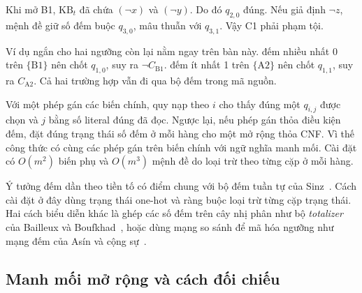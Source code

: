 \documentclass[11pt,a4paper]{article}
\newcommand{\code}[1]{\texttt{\detokenize{#1}}}
\newcommand{\KB}{\mathrm{KB}}
\begin{document}
Khi mở B1, $\KB_t$ đã chứa $(\neg x)$ và $(\neg y)$.
Do đó $q_{2,0}$ đúng. Nếu giả định $\neg z$, mệnh đề giữ số đếm
buộc $q_{3,0}$, mâu thuẫn với $q_{3,1}$.
Vậy C1 phải phạm tội.

Ví dụ ngắn cho hai ngưỡng còn lại nằm ngay trên bàn này.
\code{clue_A1} đếm nhiều nhất 0 trên $\{\mathrm{B1}\}$ nên
chốt $q_{1,0}$, suy ra $\neg C_{\mathrm{B1}}$.
\code{clue_C1} đếm ít nhất 1 trên $\{\mathrm{A2}\}$ nên chốt
$q_{1,1}$, suy ra $C_{\mathrm{A2}}$.
Cả hai trường hợp vẫn đi qua bộ đếm trong mã nguồn.

Với một phép gán các biến chính, quy nạp theo $i$ cho thấy đúng
một $q_{i,j}$ được chọn và $j$ bằng số literal đúng đã đọc.
Ngược lại, nếu phép gán thỏa điều kiện đếm, đặt đúng trạng thái
số đếm ở mỗi hàng cho một mở rộng thỏa CNF.
Vì thế công thức có cùng các phép gán trên biến chính với ngữ
nghĩa manh mối. Cài đặt có $O(m^2)$ biến phụ và $O(m^3)$
mệnh đề do loại trừ theo từng cặp ở mỗi hàng.

Ý tưởng đếm dần theo tiền tố có điểm chung với bộ đếm tuần tự của
Sinz~\cite{sinz}. Cách cài đặt ở đây dùng trạng thái one-hot và
ràng buộc loại trừ từng cặp trạng thái. Hai cách biểu diễn khác là
ghép các số đếm trên cây nhị phân như bộ \emph{totalizer} của
Bailleux và Boufkhad~\cite{totalizer}, hoặc dùng mạng so sánh để
mã hóa ngưỡng như mạng đếm của Asín và cộng sự~\cite{cardinality-networks}.

\clearpage

\subsection{Manh mối mở rộng và cách đối chiếu}
\label{sec:extensions}
\end{document}
